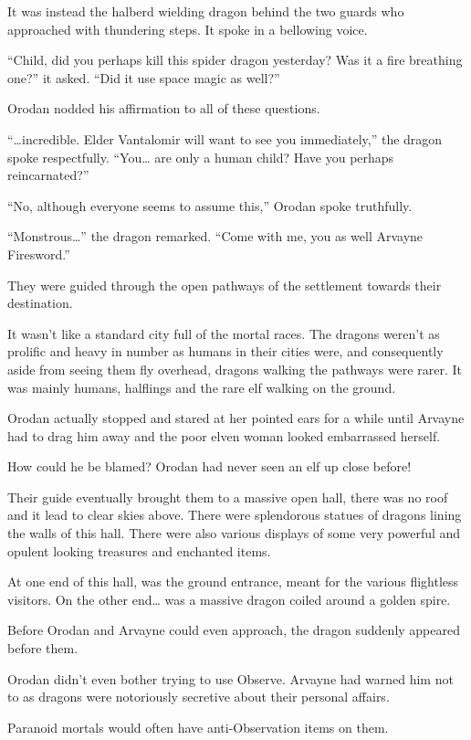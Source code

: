 \documentclass[a4paper,10pt]{book}
\begin{document}
It was instead the halberd wielding dragon behind the two guards who approached with thundering steps. It spoke in a bellowing voice.\par
“Child, did you perhaps kill this spider dragon yesterday? Was it a fire breathing one?” it asked. “Did it use space magic as well?”\par
Orodan nodded his affirmation to all of these questions.\par
“…incredible. Elder Vantalomir will want to see you immediately,” the dragon spoke respectfully. “You… are only a human child? Have you perhaps reincarnated?”\par
“No, although everyone seems to assume this,” Orodan spoke truthfully.\par
“Monstrous…” the dragon remarked. “Come with me, you as well Arvayne Firesword.”\par
They were guided through the open pathways of the settlement towards their destination.\par
It wasn’t like a standard city full of the mortal races. The dragons weren’t as prolific and heavy in number as humans in their cities were, and consequently aside from seeing them fly overhead, dragons walking the pathways were rarer. It was mainly humans, halflings and the rare elf walking on the ground.\par
Orodan actually stopped and stared at her pointed ears for a while until Arvayne had to drag him away and the poor elven woman looked embarrassed herself.\par
How could he be blamed? Orodan had never seen an elf up close before!\par
Their guide eventually brought them to a massive open hall, there was no roof and it lead to clear skies above. There were splendorous statues of dragons lining the walls of this hall. There were also various displays of some very powerful and opulent looking treasures and enchanted items.\par
At one end of this hall, was the ground entrance, meant for the various flightless visitors. On the other end… was a massive dragon coiled around a golden spire.\par
Before Orodan and Arvayne could even approach, the dragon suddenly appeared before them.\par
Orodan didn’t even bother trying to use Observe. Arvayne had warned him not to as dragons were notoriously secretive about their personal affairs.\par
Paranoid mortals would often have anti-Observation items on them.\par
\end{document}
